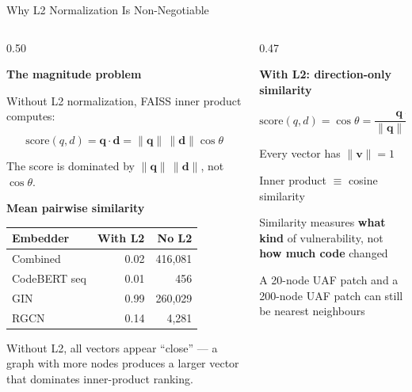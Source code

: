 \documentclass[aspectratio=169,10pt]{beamer}
\newcommand{\cmiss}[1]{\cellcolor{miss!25} #1}
\begin{document}
\begin{frame}{Why L2 Normalization Is Non-Negotiable}
\begin{columns}[T]
\begin{column}{0.50\textwidth}

  \textbf{The magnitude problem}

  \vspace{0.3em}
  {\small Without L2 normalization, FAISS inner product computes:}

  $$\text{score}(q, d) = \mathbf{q} \cdot \mathbf{d} = \|\mathbf{q}\| \, \|\mathbf{d}\| \cos\theta$$

  {\small The score is dominated by $\|\mathbf{q}\| \, \|\mathbf{d}\|$, not $\cos\theta$.}

  \vspace{0.6em}
  \textbf{Mean pairwise similarity}

  \vspace{0.3em}
  {\small
  \renewcommand{\arraystretch}{1.25}
  \begin{tabular}{lrr}
    \toprule
    \textbf{Embedder} & \textbf{With L2} & \textbf{No L2} \\
    \midrule
    Combined      & 0.02   & \cmiss{416{,}081} \\
    CodeBERT seq  & 0.01   & \cmiss{456} \\
    GIN           & 0.99   & \cmiss{260{,}029} \\
    RGCN          & 0.14   & \cmiss{4{,}281} \\
    \bottomrule
  \end{tabular}}

  \vspace{0.3em}
  {\scriptsize\color{black!55}
  Without L2, all vectors appear ``close'' — a graph with more nodes
  produces a larger vector that dominates inner-product ranking.}

\end{column}
\begin{column}{0.47\textwidth}

  \textbf{With L2: direction-only similarity}

  \vspace{0.3em}
  $$\text{score}(q, d) = \cos\theta = \frac{\mathbf{q} \cdot \mathbf{d}}{\|\mathbf{q}\| \, \|\mathbf{d}\|} \in [-1, 1]$$

  \vspace{0.2em}
  \begin{itemize}\setlength{\itemsep}{3pt}
    {\small
    \item Every vector has $\|\mathbf{v}\| = 1$
    \item Inner product $\equiv$ cosine similarity
    \item Similarity measures \textbf{what kind} of vulnerability,
          not \textbf{how much code} changed
    \item A 20-node UAF patch and a 200-node UAF patch
          can still be nearest neighbours}
  \end{itemize}


\end{column}
\end{columns}
\end{frame}
\end{document}
